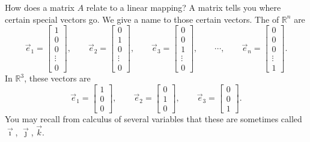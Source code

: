 How does a matrix $A$ relate to a linear mapping?
A matrix tells you where
certain special vectors go.  We give a name to those certain vectors.
The \emph{} of ${\mathbb R}^n$ are
\begin{equation*}
\vec{e}_1 =
\begin{bmatrix}
1 \\ 0 \\ 0 \\ \vdots \\ 0
\end{bmatrix} ,
\qquad
\vec{e}_2 =
\begin{bmatrix}
0 \\ 1 \\ 0 \\ \vdots \\ 0
\end{bmatrix} ,
\qquad
\vec{e}_3 =
\begin{bmatrix}
0 \\ 0 \\ 1 \\ \vdots \\ 0
\end{bmatrix} ,
\qquad
\cdots ,
\qquad
\vec{e}_n =
\begin{bmatrix}
0 \\ 0 \\ 0 \\ \vdots \\ 1
\end{bmatrix} .
\end{equation*}
In ${\mathbb R}^3$, these vectors are
\begin{equation*}
\vec{e}_1 =
\begin{bmatrix}
1 \\ 0 \\ 0
\end{bmatrix} ,
\qquad
\vec{e}_2 =
\begin{bmatrix}
0 \\ 1 \\ 0
\end{bmatrix} ,
\qquad
\vec{e}_3 =
\begin{bmatrix}
0 \\ 0 \\ 1
\end{bmatrix} .
\end{equation*}
You may recall from calculus of several variables that these are
sometimes called $\vec{\imath}$, $\vec{\jmath}$, $\vec{k}$.

